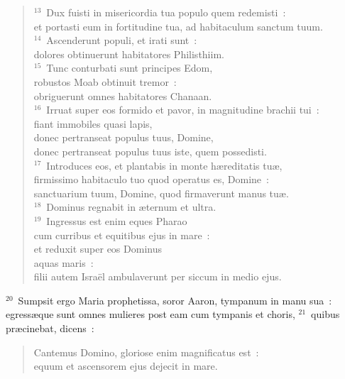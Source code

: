 \begin{flushleft}
\begin{verse}
${}^{13}$~Dux fuisti in misericordia tua populo quem redemisti~:\\ et portasti eum in fortitudine tua, ad habitaculum sanctum tuum.\\
${}^{14}$~Ascenderunt populi, et irati sunt~:\\ dolores obtinuerunt habitatores Philisthiim.\\
${}^{15}$~Tunc conturbati sunt principes Edom,\\ robustos Moab obtinuit tremor~:\\ obriguerunt omnes habitatores Chanaan.\\
${}^{16}$~Irruat super eos formido et pavor, in magnitudine brachii tui~:\\ fiant immobiles quasi lapis,\\ donec pertranseat populus tuus, Domine,\\ donec pertranseat populus tuus iste, quem possedisti.\\
${}^{17}$~Introduces eos, et plantabis in monte h\ae reditatis tu\ae ,\\ firmissimo habitaculo tuo quod operatus es, Domine~:\\ sanctuarium tuum, Domine, quod firmaverunt manus tu\ae .\\
${}^{18}$~Dominus regnabit in \ae ternum et ultra.\\
${}^{19}$~Ingressus est enim eques Pharao\\ cum curribus et equitibus ejus in mare~:\\ et reduxit super eos Dominus\\ aquas maris~:\\ filii autem Isra\"el ambulaverunt per siccum in medio ejus.\end{verse}\end{flushleft}


${}^{20}$~Sumpsit ergo Maria prophetissa, soror Aaron, tympanum in manu sua~: egress\ae que sunt omnes mulieres post eam cum tympanis et choris,
${}^{21}$~quibus pr\ae cinebat, dicens~: \begin{flushleft}\begin{verse}Cantemus Domino, gloriose enim magnificatus est~:\\ equum et ascensorem ejus dejecit in mare.\end{verse}\end{flushleft}


